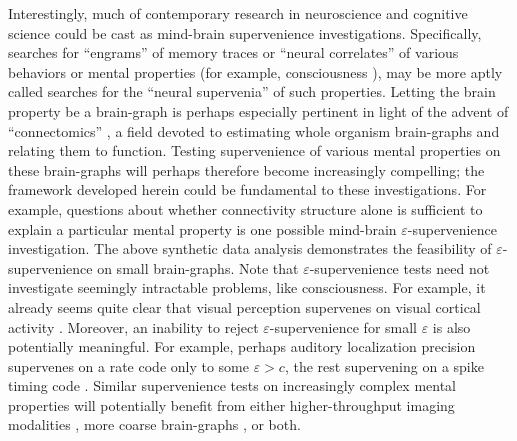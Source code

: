 \documentclass{article}
\newcommand{\eps}{\varepsilon}
\begin{document}
Interestingly, much of contemporary research in neuroscience and cognitive science could be cast as mind-brain supervenience investigations.  Specifically, searches for ``engrams'' of  memory traces \cite{Lashley50} or ``neural correlates''  of various behaviors or mental properties (for example, consciousness \cite{Koch2010}), may be more aptly called searches for the ``neural supervenia'' of such properties.
Letting the brain property be a brain-graph is perhaps especially pertinent in light of the advent of ``connectomics'' \cite{SpornsKotter05,Hagmann05}, a field devoted to estimating whole organism brain-graphs and relating them to function.  Testing supervenience of various mental properties on these brain-graphs will perhaps therefore become increasingly compelling; the framework developed herein could be fundamental to these investigations.  
For example, questions about whether connectivity structure alone is sufficient to explain a particular mental property is one possible mind-brain $\eps$-supervenience investigation.  The above synthetic data analysis demonstrates the feasibility of $\eps$-supervenience on small brain-graphs.
Note that $\eps$-supervenience tests need not investigate seemingly intractable problems, like consciousness.  For example, it already seems quite clear that visual perception supervenes on visual cortical activity \cite{??}. Moreover, an inability to reject $\eps$-supervenience for small $\eps$ is also potentially meaningful.  For example, perhaps auditory localization precision supervenes on a rate code only to some $\eps > c$, the rest supervening on a spike timing code \cite{??}. 
Similar supervenience tests on increasingly complex mental properties will potentially benefit from either higher-throughput imaging modalities \cite{HayworthLichtman06, Bock2011}, more coarse brain-graphs \cite{PalmAmunts10,Johansen-Berg2009}, or both.




\end{document}
